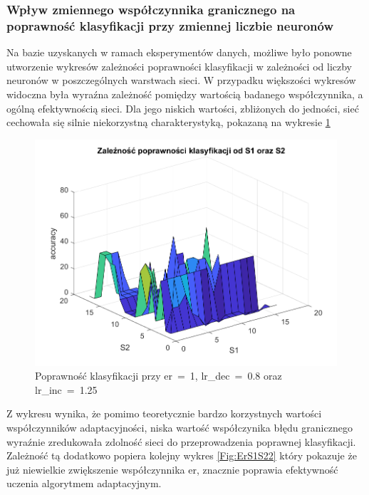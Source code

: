 \documentclass[12pt,twoside]{article}
\begin{document}
\clearpage
\subsubsection{Wpływ zmiennego współczynnika granicznego na poprawność klasyfikacji przy zmiennej liczbie neuronów}
Na bazie uzyskanych w ramach eksperymentów danych, możliwe było ponowne utworzenie wykresów zależności poprawności  klasyfikacji w zależności od liczby neuronów w poszczególnych warstwach sieci.
W przypadku większości wykresów widoczna była wyraźna zależność pomiędzy wartością badanego współczynnika, a ogólną efektywnością sieci.
Dla jego niskich wartości, zbliżonych do jedności, sieć cechowała się silnie niekorzystną charakterystyką, pokazaną na wykresie \ref{Fig:ErS1S21}

\begin{figure}[ht]
	\centering
	\includegraphics[width=16cm]{figures/ErS1S2_1.png}
	\caption{Poprawność klasyfikacji przy er~=~1, lr\_dec~=~0.8 oraz lr\_inc~=~1.25}
	\label{Fig:ErS1S21}
\end{figure}
Z wykresu wynika, że pomimo teoretycznie bardzo korzystnych wartości współczynników adaptacyjności, niska wartość współczynika błędu granicznego wyraźnie zredukowała zdolność sieci do przeprowadzenia poprawnej klasyfikacji.
Zależność tą dodatkowo popiera kolejny wykres \ref{Fig:ErS1S22} który pokazuje że już niewielkie zwiększenie współczynnika er, znacznie poprawia efektywność uczenia algorytmem adaptacyjnym.
\end{document}
